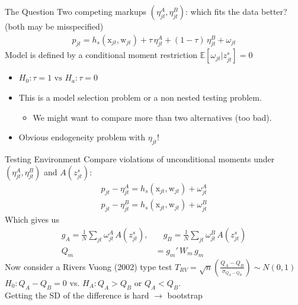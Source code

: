 \documentclass[xcolor=pdftex,dvipsnames,table,mathserif,aspectratio=169]{beamer}
\begin{document}
\begin{frame}{The Question}
Two competing markups $(\eta_{jt}^A, \eta_{jt}^B)$: which fits the data better?\\
(both may be misspecified)
\begin{align*}
p_{jt} = h_s(\textrm{x}_{jt},\textrm{w}_{jt}) + \tau\, \eta_{jt}^A + (1-\tau)\,\eta_{jt}^B + \omega_{jt}
\end{align*}
Model is defined by a conditional moment restriction $\mathbb{E}[\omega_{jt}  | z_{jt}^s]=0$
\begin{itemize}
\item $H_0: \tau =1 \text{ vs } H_a: \tau = 0$
\item This is a \alert{model selection} problem or a \alert{non nested testing} problem.
\begin{itemize}
\item We might want to compare more than two alternatives (too bad).
\end{itemize}
\item Obvious endogeneity problem with $\eta_{jt}$!
\end{itemize}
\end{frame}


\begin{frame}{Testing Environment}
Compare violations of unconditional moments under $(\eta_{jt}^A, \eta_{jt}^B)$ and $A(z_{jt}^s)$:
\begin{align*}
p_{jt} -  \eta_{jt}^A = h_s(\textrm{x}_{jt},\textrm{w}_{jt}) + \omega_{jt}^{A}\\
p_{jt} -  \eta_{jt}^B = h_s(\textrm{x}_{jt},\textrm{w}_{jt}) + \omega_{jt}^{B}
\end{align*}
\pause
Which gives us
\begin{align*}
g_A = \frac{1}{N} \sum_{jt} \omega_{jt}^{A}\, A(z_{jt}^s), &\quad
g_B =\frac{1}{N} \sum_{jt}  \omega_{jt}^{B}\, A(z_{jt}^s)\\
Q_m &= g_m'\, W_m\, g_m
\end{align*}
Now consider a \alert{Rivers Vuong (2002)} type test $T_{RV} = \sqrt{n} \left(\frac{Q_A - Q_B}{\sigma_{Q_A - Q_B}}\right) \sim N(0,1)$
$H_0: Q_A - Q_B=0$ vs. $H_A: Q_A > Q_B$ or $Q_A < Q_B$.\\
Getting the SD of the difference is hard $\rightarrow$ bootstrap 
\end{frame}
\end{document}
